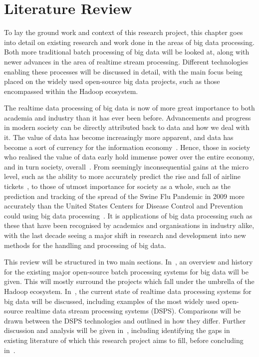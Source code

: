 \chapter{Literature Review}
\label{sec:litrev}

To lay the ground work and context of this research project, this chapter goes into detail on existing
research and work done in the areas of big data processing. Both more traditional batch processing of big
data will be looked at, along with newer advances in the area of realtime stream processing. Different
technologies enabling these processes will be discussed in detail, with the main focus being placed on the
widely used open-source big data projects, such as those encompassed within the Hadoop ecosystem.

The realtime data processing of big data is now of more great importance to both academia and industry than it has
ever been before. Advancements and progress in modern society can be directly attributed back to data and
how we deal with it. The value of data has become increasingly more apparent, and data has become a sort of
currency for the information economy~\cite{st2009examining}. Hence, those in society who realised the value of
data early hold immense power over the entire economy, and in turn society,
overall~\cite{lievesley1993increasing}. From seemingly inconsequential gains at the micro level, such as the
ability to more accurately predict the rise and fall of airline tickets~\cite{darlin2006airfares}, to those
of utmost importance for society as a whole, such as the prediction and tracking of the spread of the Swine Flu
Pandemic in 2009 more accurately than the United States Centers for Disease Control and Prevention
could using big data processing~\cite{ritterman2009using,mayer2013big}. It is applications of big data
processing such as these that have been recognised by academics and organisations in industry alike, with the
last decade seeing a major shift in research and development into new methods for the handling
and processing of big data.

This review will be structured in two main sections.
In~, an overview and history for the existing major open-source batch
processing systems for big data will be given. This will mostly surround the projects which fall under the
umbrella of the Hadoop ecosystem. In~, the current state of realtime
data processing systems for big data will be discussed, including examples of the most widely used open-source realtime
data stream processing systems (DSPS). Comparisons will be drawn between the DSPS technologies and outlined
in how they differ. Further discussion and analysis will be given in~,
including identifying the gaps in existing literature of which this research project aims to fill,
before concluding in~.

